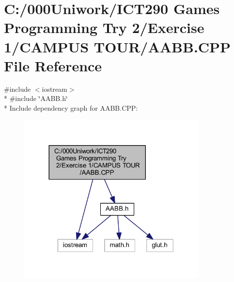 \hypertarget{_a_a_b_b_8_c_p_p}{}\section{C\+:/000\+Uniwork/\+I\+C\+T290 Games Programming Try 2/\+Exercise 1/\+C\+A\+M\+P\+US T\+O\+U\+R/\+A\+A\+BB.C\+PP File Reference}
\label{_a_a_b_b_8_c_p_p}
{\ttfamily \#include $<$iostream$>$}\\*
{\ttfamily \#include \char`\"{}A\+A\+B\+B.\+h\char`\"{}}\\*
Include dependency graph for A\+A\+B\+B.\+C\+PP\+:
\nopagebreak
\begin{figure}[H]
\begin{center}
\leavevmode
\includegraphics[width=272pt]{_a_a_b_b_8_c_p_p__incl}
\end{center}
\end{figure}
